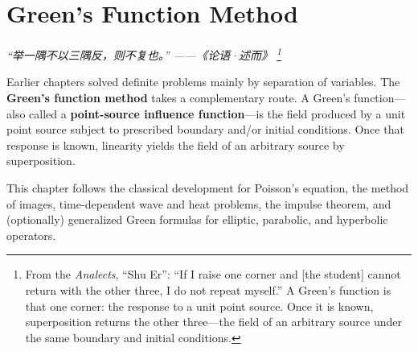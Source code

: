 \chapter{Green's Function Method}
\renewcommand{\currentchapterpath}{chapters/ch07/}

\begin{flushright}
\textit{“举一隅不以三隅反，则不复也。” ——《论语·述而》
\footnote{From the \textit{Analects}, ``Shu Er'': ``If I raise one corner and [the student] cannot return with the other three, I do not repeat myself.'' A Green's function is that one corner: the response to a unit point source. Once it is known, superposition returns the other three---the field of an arbitrary source under the same boundary and initial conditions.}}
\end{flushright}

Earlier chapters solved definite problems mainly by separation of variables. The \textbf{Green's function method} takes a complementary route. A Green's function---also called a \textbf{point-source influence function}---is the field produced by a unit point source subject to prescribed boundary and/or initial conditions. Once that response is known, linearity yields the field of an arbitrary source by superposition.

This chapter follows the classical development for Poisson's equation, the method of images, time-dependent wave and heat problems, the impulse theorem, and (optionally) generalized Green formulas for elliptic, parabolic, and hyperbolic operators.

